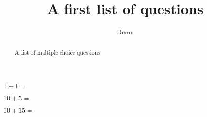 \documentclass{ximera}
\title{A first list of questions}
\author{Demo}
\begin{document}
\begin{abstract}
    A list of multiple choice questions
\end{abstract}
\maketitle


\begin{exercise}
    $1+1=$
    \begin{multipleChoice}
        \end{multipleChoice}
\end{exercise}

\begin{exercise}
    $10+5=$
    \begin{multipleChoice}
    \end{multipleChoice}
\end{exercise}

\begin{exercise}
    $10+15=$
    \begin{multipleChoice}
    \end{multipleChoice}
\end{exercise}
\end{document}
